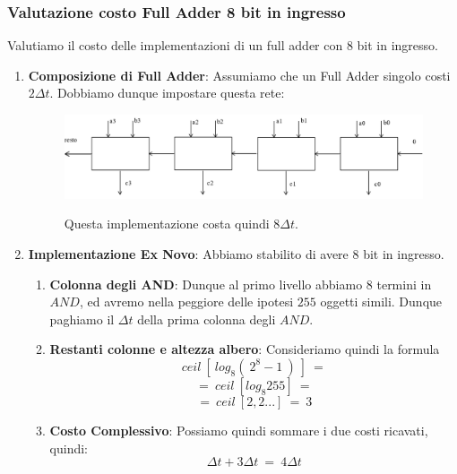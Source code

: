 \documentclass{article}
\begin{document}
\newpage

\subsubsection{Valutazione costo Full Adder 8 bit in ingresso}

Valutiamo il costo delle implementazioni di un full adder con 8 bit in ingresso.

\vspace*{25px}

\begin{enumerate}
    \item \textbf{Composizione di Full Adder}: Assumiamo che un Full Adder singolo costi $2\Delta t$. Dobbiamo dunque impostare questa rete:
    \begin{figure}[htbp]
        \center
        \includegraphics[scale=0.4]{img/fullAdder8bit1.png}
        
        Questa implementazione costa quindi $8\Delta t$.
    \end{figure}

    \vspace*{25px}
    
    \item \textbf{Implementazione Ex Novo}: Abbiamo stabilito di avere $8$ bit in ingresso. 
    \begin{enumerate}
        \item \textbf{Colonna degli AND}: Dunque al primo livello abbiamo $8$ termini in $AND$, ed avremo nella peggiore delle ipotesi $255$ oggetti simili. Dunque paghiamo il $\Delta t$ della prima colonna degli $AND$.

        \vspace*{15px}
        
        \item \textbf{Restanti colonne e altezza albero}: Consideriamo quindi la formula
        \[ ceil \: [ \: log_{8} ( \:2^{8}-1 \: )\:] \: = \]
        \[ = \: ceil \: [log_{8} 255] \: = \]
        \[ = \: ceil\:[2,2...] \: = \: 3 \]

        \vspace*{15px}
        
        \item \textbf{Costo Complessivo}: Possiamo quindi sommare i due costi ricavati, quindi:
        \[ \Delta t + 3\Delta t \: = \: 4\Delta t \]
    \end{enumerate}
    
\end{enumerate}
\end{document}
